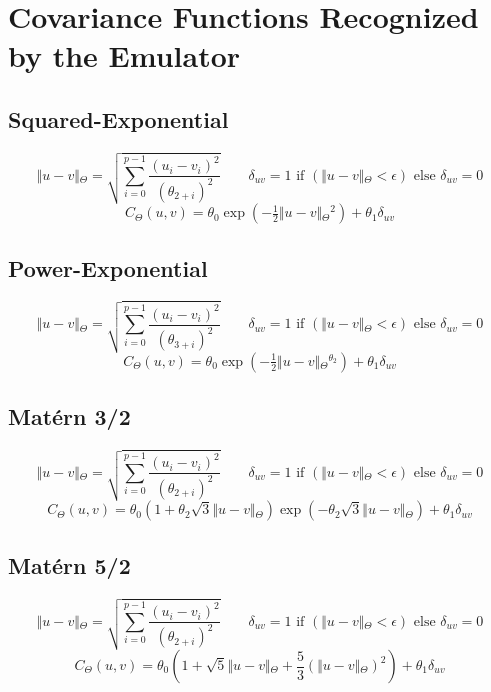 
\section{Covariance Functions Recognized by the Emulator}
\label{CovarianceFunctions}

\subsection*{Squared-Exponential}
\[ \Vert{}u-v\Vert{}_\Theta{} = \sqrt{\sum_{i=0}^{p-1} \frac{(u_i - v_i)^2}{(\theta{}_{2+i})^2}} \qquad
 \delta{}_{uv} = 1 \text{ if } (\Vert{}u-v\Vert{}_\Theta{} < \epsilon{}) \textrm{ else } \delta{}_{uv} = 0 \]
\[ C_\Theta{}(u, v) = \theta{}_0 \exp\left({-\tfrac{1}{2} \Vert{}u-v\Vert{}_\Theta{}^2}\right) + \theta{}_1\delta{}_{uv} \]

\subsection*{Power-Exponential}
\[ \Vert{}u-v\Vert{}_\Theta{} = \sqrt{\sum_{i=0}^{p-1} \frac{(u_i - v_i)^2}{(\theta{}_{3+i})^2}} \qquad
 \delta{}_{uv} = 1 \text{ if } (\Vert{}u-v\Vert{}_\Theta{} < \epsilon{}) \textrm{ else } \delta{}_{uv} = 0 \]
\[ C_\Theta{}(u, v) = \theta{}_0 \exp\left({-\tfrac{1}{2} \Vert{}u-v\Vert{}_\Theta{}^{\theta{}_2}}\right) + \theta{}_1\delta{}_{uv} \]

\subsection*{Mat\'{e}rn 3/2}
\[ \Vert{}u-v\Vert{}_\Theta{} = \sqrt{\sum_{i=0}^{p-1} \frac{(u_i - v_i)^2}{(\theta{}_{2+i})^2}} \qquad
 \delta{}_{uv} = 1 \text{ if } (\Vert{}u-v\Vert{}_\Theta{} < \epsilon{}) \textrm{ else } \delta{}_{uv} = 0 \]
\[ C_\Theta{}(u, v) = {\theta{}_0} \left({ 1 + \theta{}_2 \sqrt{3} \Vert{}u-v\Vert{}_\Theta{} }\right)
\exp \left({ - \theta{}_2 \sqrt{3} \Vert{}u-v\Vert{}_\Theta{} }\right) + \theta{}_1\delta{}_{uv} \]


\subsection*{Mat\'{e}rn 5/2}
\[ \Vert{}u-v\Vert{}_\Theta{} = \sqrt{\sum_{i=0}^{p-1} \frac{(u_i - v_i)^2}{(\theta{}_{2+i})^2}} \qquad
 \delta{}_{uv} = 1 \text{ if } (\Vert{}u-v\Vert{}_\Theta{} < \epsilon{}) \textrm{ else } \delta{}_{uv} = 0 \]
\[ C_\Theta{}(u, v) = {\theta{}_0} \left({ 1 + \sqrt{5} \Vert{}u-v\Vert{}_\Theta{}
 + \dfrac{5}{3} \left({\Vert{}u-v\Vert{}_\Theta{}}\right)^2  }\right) + \theta{}_1\delta{}_{uv} \]

